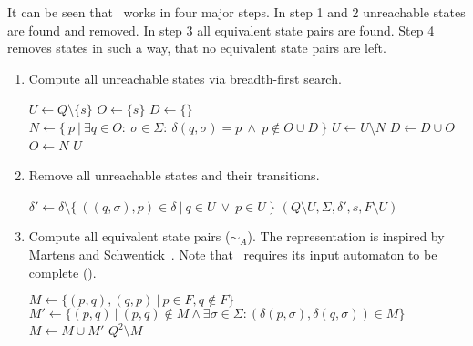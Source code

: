 \noindent It can be seen that \MinAlg\ works in four major steps. In step 1 and 2 unreachable states are found and removed. In step 3 all equivalent state pairs are found. Step 4 removes states in such a way, that no equivalent state pairs are left.
\begin{enumerate}
	\item Compute all unreachable states via breadth-first search.
	
	\vspace{0.2cm}
	\begin{algorithmic}[1]
			\State $U \gets Q \setminus \{s\}$	
			\State $O \gets \{s\}$				
			\State $D \gets \{\}$				
				\State $N \gets \{\ p\ | \ \exists q \in O\colon\ \sigma \in \Sigma \colon\ \delta(q, \sigma) = p\ \land\ p \notin O \cup D\ \}$
				\State $U \gets U \setminus N$
				\State $D \gets D \cup O$
				\State $O \gets N$
			\EndWhile
			\State \Return $U$
		\EndFunction
	\end{algorithmic}

	\item Remove all unreachable states and their transitions.
	
	\vspace{0.2cm}
	\begin{algorithmic}[1]
            \State $\delta' \gets \delta \setminus \{\ ((q,\sigma),p)\in\delta\ |\ q\in U\ \lor\ p\in U\ \}$
			\State \Return $(Q \setminus U, \Sigma, \delta', s, F \setminus U)$
		\EndFunction
	\end{algorithmic}

	\item Compute all equivalent state pairs ($\sim_A$). The representation is inspired by Martens and Schwentick~\cite[ch.~4, p.~17]{MS18}. Note that \CompDist\ requires its input automaton to be complete (\cite[p.~13]{BBC10}).
	\vspace{0.2cm}
	\begin{algorithmic}[1]
		 \label{ch:2:minmark}
		\State $M \gets \{ (p,q), (q,p)\ |\ p \in F, q \notin F \}$
		\Do
			\State $M' \gets \{ (p,q)\ |\ (p,q) \notin M \land \exists \sigma \in \Sigma \colon (\delta(p,\sigma), \delta(q,\sigma)) \in M \}$
			\State $M \gets M \cup M'$
		\State \Return $Q^2 \setminus M$
		\EndFunction
	\end{algorithmic}


\end{enumerate}
